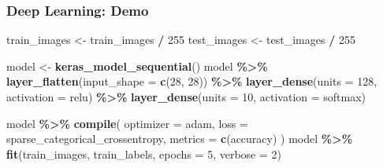 \documentclass[
  shownotes,
  xcolor={svgnames},
  hyperref={colorlinks,citecolor=DarkBlue,linkcolor=DarkRed,urlcolor=DarkBlue}
  , aspectratio=169]{beamer}
\newenvironment{Shaded}{\begin{snugshade}}{\end{snugshade}}
\newcommand{\DataTypeTok}[1]{\textcolor[rgb]{0.13,0.29,0.53}{#1}}
\newcommand{\DecValTok}[1]{\textcolor[rgb]{0.00,0.00,0.81}{#1}}
\newcommand{\KeywordTok}[1]{\textcolor[rgb]{0.13,0.29,0.53}{\textbf{#1}}}
\newcommand{\NormalTok}[1]{#1}
\newcommand{\OperatorTok}[1]{\textcolor[rgb]{0.81,0.36,0.00}{\textbf{#1}}}
\newcommand{\StringTok}[1]{\textcolor[rgb]{0.31,0.60,0.02}{#1}}
\begin{document}
\begin{frame}[fragile]
\frametitle{Deep Learning: Demo}

\begin{Shaded}
\begin{Highlighting}[]
\NormalTok{train\_images \textless{}{-}}\StringTok{ }\NormalTok{train\_images }\OperatorTok{/}\StringTok{ }\DecValTok{255}
\NormalTok{test\_images \textless{}{-}}\StringTok{ }\NormalTok{test\_images }\OperatorTok{/}\StringTok{ }\DecValTok{255}
\end{Highlighting}
\end{Shaded}



\begin{Shaded}
\begin{Highlighting}[]
\NormalTok{model \textless{}{-}}\StringTok{ }\KeywordTok{keras\_model\_sequential}\NormalTok{()}
\NormalTok{model }\OperatorTok{\%\textgreater{}\%}
\StringTok{  }\KeywordTok{layer\_flatten}\NormalTok{(}\DataTypeTok{input\_shape =} \KeywordTok{c}\NormalTok{(}\DecValTok{28}\NormalTok{, }\DecValTok{28}\NormalTok{)) }\OperatorTok{\%\textgreater{}\%}
\StringTok{  }\KeywordTok{layer\_dense}\NormalTok{(}\DataTypeTok{units =} \DecValTok{128}\NormalTok{, }\DataTypeTok{activation =} \StringTok{\textquotesingle{}relu\textquotesingle{}}\NormalTok{) }\OperatorTok{\%\textgreater{}\%}
\StringTok{  }\KeywordTok{layer\_dense}\NormalTok{(}\DataTypeTok{units =} \DecValTok{10}\NormalTok{, }\DataTypeTok{activation =} \StringTok{\textquotesingle{}softmax\textquotesingle{}}\NormalTok{)}
\end{Highlighting}
\end{Shaded}

\begin{Shaded}
\begin{Highlighting}[]
\NormalTok{model }\OperatorTok{\%\textgreater{}\%}\StringTok{ }\KeywordTok{compile}\NormalTok{(}
  \DataTypeTok{optimizer =} \StringTok{\textquotesingle{}adam\textquotesingle{}}\NormalTok{, }
  \DataTypeTok{loss =} \StringTok{\textquotesingle{}sparse\_categorical\_crossentropy\textquotesingle{}}\NormalTok{,}
  \DataTypeTok{metrics =} \KeywordTok{c}\NormalTok{(}\StringTok{\textquotesingle{}accuracy\textquotesingle{}}\NormalTok{)}
\NormalTok{)}
\NormalTok{model }\OperatorTok{\%\textgreater{}\%}\StringTok{ }\KeywordTok{fit}\NormalTok{(train\_images, train\_labels, }\DataTypeTok{epochs =} \DecValTok{5}\NormalTok{, }\DataTypeTok{verbose =} \DecValTok{2}\NormalTok{)}
\end{Highlighting}
\end{Shaded}

\end{frame}
\end{document}
